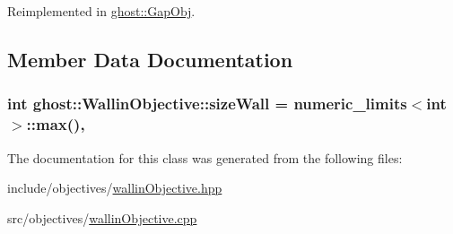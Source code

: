 Reimplemented in \hyperlink{classghost_1_1GapObj_afd55a0b02e6336d2a1f17e015488aa45}{ghost\-::\-Gap\-Obj}.



\subsection{Member Data Documentation}
\hypertarget{classghost_1_1WallinObjective_aef1d7697ca6b29eccb4f3c62f42316ed}{
\subsubsection[{size\-Wall}]{\setlength{\rightskip}{0pt plus 5cm}int ghost\-::\-Wallin\-Objective\-::size\-Wall = numeric\-\_\-limits$<$int$>$\-::max()\hspace{0.3cm}{\ttfamily [static]}, {\ttfamily [protected]}}}\label{classghost_1_1WallinObjective_aef1d7697ca6b29eccb4f3c62f42316ed}


The documentation for this class was generated from the following files\-:\begin{DoxyCompactItemize}
\item 
include/objectives/\hyperlink{wallinObjective_8hpp}{wallin\-Objective.\-hpp}\item 
src/objectives/\hyperlink{wallinObjective_8cpp}{wallin\-Objective.\-cpp}\end{DoxyCompactItemize}
